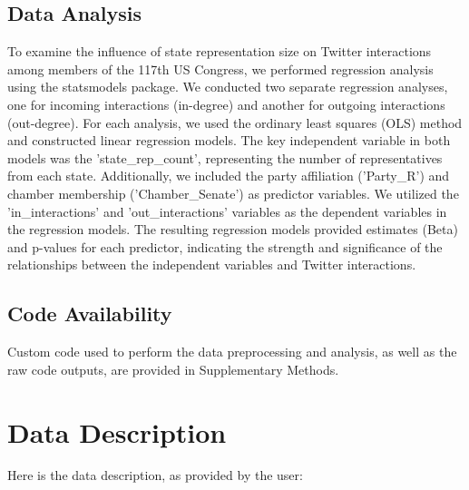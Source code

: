 \documentclass[11pt]{article}
\begin{document}
\subsection*{Data Analysis}
To examine the influence of state representation size on Twitter interactions among members of the 117th US Congress, we performed regression analysis using the statsmodels package. We conducted two separate regression analyses, one for incoming interactions (in-degree) and another for outgoing interactions (out-degree). For each analysis, we used the ordinary least squares (OLS) method and constructed linear regression models. The key independent variable in both models was the 'state\_rep\_count', representing the number of representatives from each state. Additionally, we included the party affiliation ('Party\_R') and chamber membership ('Chamber\_Senate') as predictor variables. We utilized the 'in\_interactions' and 'out\_interactions' variables as the dependent variables in the regression models. The resulting regression models provided estimates (Beta) and p-values for each predictor, indicating the strength and significance of the relationships between the independent variables and Twitter interactions.\subsection*{Code Availability}

Custom code used to perform the data preprocessing and analysis, as well as the raw code outputs, are provided in Supplementary Methods.


\clearpage
\appendix

\section{Data Description} \label{sec:data_description} Here is the data description, as provided by the user:
\end{document}
